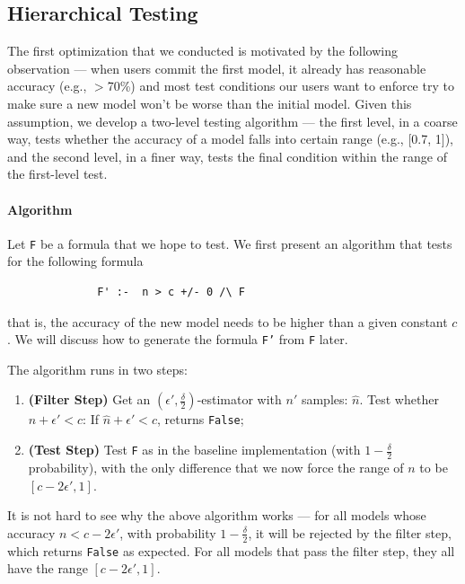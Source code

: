 \documentclass{article}
\begin{document}
\subsection{Hierarchical Testing}

The first optimization that we conducted is motivated
by the following observation --- when users commit the first
model, it already has reasonable accuracy (e.g., $>$70\%)
and most test conditions our users want to enforce try to 
make sure a new model won't be worse than the initial model.
Given this assumption, we develop a two-level testing
algorithm --- the first level, in a coarse way, tests
whether the accuracy of a model falls into certain range
(e.g., [0.7, 1]), and the second level, in a finer way,
tests the final condition within the range of the first-level
test. 

\paragraph*{Algorithm} Let \texttt{F} be a formula that
we hope to test. We first present an algorithm that
tests for the following formula
\begin{verbatim}
              F' :-  n > c +/- 0 /\ F
\end{verbatim}
that is, the accuracy of the new model needs to be 
higher than a given constant $c$. We will discuss how 
to generate the formula \texttt{F'} from \texttt{F}
later.

The algorithm runs in two steps:
\begin{enumerate}
\item {\bf (Filter Step)} Get an $(\epsilon', \frac{\delta}{2})$-estimator with $n'$ samples: $\hat{n}$.
Test whether $\hat{n} + \epsilon' < c$: If 
$\hat{n} + \epsilon' < c$, returns \texttt{False};
\item {\bf (Test Step)} Test \texttt{F} as in the baseline
implementation (with $1 - \frac{\delta}{2}$ probability), 
with the only difference that we now
force the range of $n$ to be $[c - 2\epsilon', 1]$.
\end{enumerate}

It is not hard to see why the above algorithm works ---
for all models whose accuracy $n < c - 2\epsilon'$, with
probability $1 - \frac{\delta}{2}$, it will be rejected 
by the filter step, which returns \texttt{False}
as expected. For all models that pass the filter step,
they all have the range $[c - 2\epsilon', 1]$.
\end{document}
